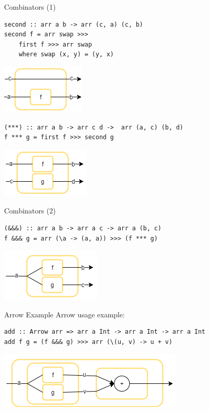 \begin{frame}[fragile]{Combinators (1)}
\begin{lstlisting}[frame=htrbl]
second :: arr a b -> arr (c, a) (c, b)
second f = arr swap >>>
	first f >>> arr swap
	where swap (x, y) = (y, x)
\end{lstlisting}
\begin{center}
	\includegraphics[scale=0.6]{images/second}
\end{center}
\begin{lstlisting}[frame=htrbl]
(***) :: arr a b -> arr c d ->	arr (a, c) (b, d)
f *** g = first f >>> second g
\end{lstlisting}
\begin{center}
	\includegraphics[scale=0.6]{images/starstarstar}
\end{center}
\end{frame}
\begin{frame}[fragile]{Combinators (2)}
\begin{lstlisting}[frame=htrbl]
(&&&) :: arr a b -> arr a c -> arr a (b, c)
f &&& g = arr (\a -> (a, a)) >>> (f *** g)
\end{lstlisting}
\begin{center}
	\includegraphics[scale=0.6]{images/dollardollardollar}
\end{center}
\end{frame}

\begin{frame}[fragile]{Arrow Example}
	Arrow usage example:
\begin{lstlisting}[frame=htrbl]
add :: Arrow arr => arr a Int -> arr a Int -> arr a Int
add f g = (f &&& g) >>> arr (\(u, v) -> u + v)
\end{lstlisting}
	\begin{center}
		\includegraphics[scale=0.6]{images/addA-comb}
	\end{center}
\end{frame}